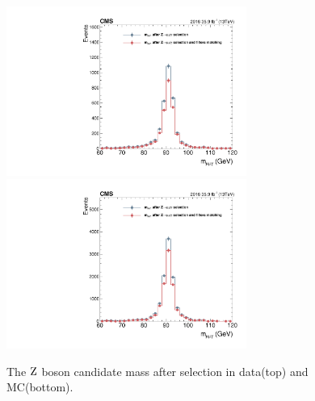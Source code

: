 		\begin{figure}[p]
		  \centering
		    \includegraphics[width=0.7\textwidth]{Fig/Trigger/Kinematics/m_mumugamma_data}\\
		    \includegraphics[width=0.7\textwidth]{Fig/Trigger/Kinematics/m_mumugamma_MC_DYJetsToLL_aMCatNLO}\\
		    \caption[Muon SFs]{
		        The $\mathrm{Z}$ boson candidate mass after selection in data(top) and MC(bottom).\label{fig:Trigplotmass}}
		\end{figure}
		
